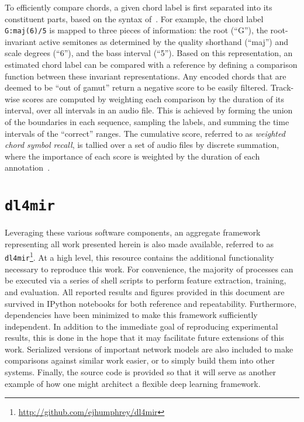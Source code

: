 To efficiently compare chords, a given chord label is first separated into its
constituent parts, based on the syntax of~\cite{Harte2010Towards}.
For example, the chord label \texttt{G:maj(6)/5} is mapped to three pieces of information: the root (``G''), the root-invariant active semitones as determined by the quality shorthand (``maj'') and scale degrees (``6''), and the bass interval (``5'').
Based on this representation, an estimated chord label can be compared with a reference by defining a comparison function between these invariant representations.
Any encoded chords that are deemed to be ``out of gamut'' return a negative score to be easily filtered.
Track-wise scores are computed by weighting each comparison by the duration of its interval, over all intervals in an audio file.
This is achieved by forming the union of the boundaries in each sequence, sampling the labels, and summing the time intervals of the ``correct'' ranges.
The cumulative score, referred to as \emph{weighted chord symbol recall}, is tallied over a set of audio files by discrete summation, where the importance of each score is weighted by the duration of each annotation~\cite{Mauch2010Automatic}.


\section{\texttt{dl4mir}}
\label{sec:dl4mir}

Leveraging these various software components, an aggregate framework representing all work presented herein is also made available, referred to as \texttt{dl4mir}\footnote{\url{http://github.com/ejhumphrey/dl4mir}}.
At a high level, this resource contains the additional functionality necessary to reproduce this work.
For convenience, the majority of processes can be executed via a series of shell scripts to perform feature extraction, training, and evaluation.
All reported results and figures provided in this document are survived in IPython notebooks for both reference and repeatability.
Furthermore, dependencies have been minimized to make this framework sufficiently independent.
In addition to the immediate goal of reproducing experimental results, this is done in the hope that it may facilitate future extensions of this work.
Serialized versions of important network models are also included to make comparisons against similar work easier, or to simply build them into other systems.
Finally, the source code is provided so that it will serve as another example of how one might architect a flexible deep learning framework.


